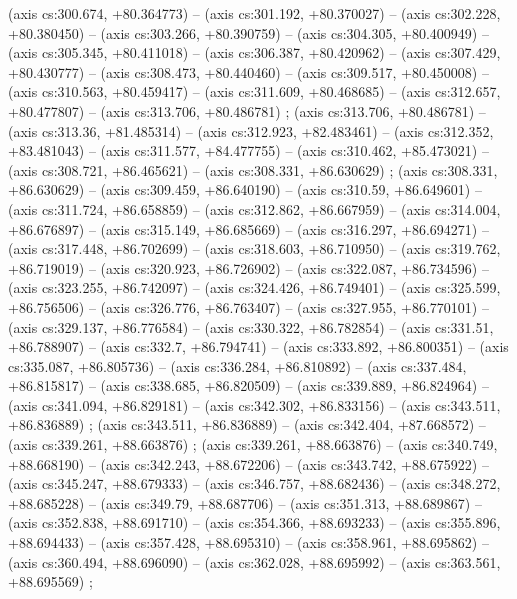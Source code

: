     (axis cs:300.674,    +80.364773) --  (axis cs:301.192,    +80.370027) --  (axis cs:302.228,    +80.380450) --  (axis cs:303.266,    +80.390759) --  (axis cs:304.305,    +80.400949) --  (axis cs:305.345,    +80.411018) --  (axis cs:306.387,    +80.420962) --  (axis cs:307.429,    +80.430777) --  (axis cs:308.473,    +80.440460) --  (axis cs:309.517,    +80.450008) --  (axis cs:310.563,    +80.459417) --  (axis cs:311.609,    +80.468685) --  (axis cs:312.657,    +80.477807) --  (axis cs:313.706,    +80.486781) ;
    (axis cs:313.706,    +80.486781) --  (axis cs:313.36,    +81.485314) --  (axis cs:312.923,    +82.483461) --  (axis cs:312.352,    +83.481043) --  (axis cs:311.577,    +84.477755) --  (axis cs:310.462,    +85.473021) --  (axis cs:308.721,    +86.465621) --  (axis cs:308.331,    +86.630629) ;
    (axis cs:308.331,    +86.630629) --  (axis cs:309.459,    +86.640190) --  (axis cs:310.59,    +86.649601) --  (axis cs:311.724,    +86.658859) --  (axis cs:312.862,    +86.667959) --  (axis cs:314.004,    +86.676897) --  (axis cs:315.149,    +86.685669) --  (axis cs:316.297,    +86.694271) --  (axis cs:317.448,    +86.702699) --  (axis cs:318.603,    +86.710950) --  (axis cs:319.762,    +86.719019) --  (axis cs:320.923,    +86.726902) --  (axis cs:322.087,    +86.734596) --  (axis cs:323.255,    +86.742097) --  (axis cs:324.426,    +86.749401) --  (axis cs:325.599,    +86.756506) --  (axis cs:326.776,    +86.763407) --  (axis cs:327.955,    +86.770101) --  (axis cs:329.137,    +86.776584) --  (axis cs:330.322,    +86.782854) --  (axis cs:331.51,    +86.788907) --  (axis cs:332.7,    +86.794741) --  (axis cs:333.892,    +86.800351) --  (axis cs:335.087,    +86.805736) --  (axis cs:336.284,    +86.810892) --  (axis cs:337.484,    +86.815817) --  (axis cs:338.685,    +86.820509) --  (axis cs:339.889,    +86.824964) --  (axis cs:341.094,    +86.829181) --  (axis cs:342.302,    +86.833156) --  (axis cs:343.511,    +86.836889) ;
    (axis cs:343.511,    +86.836889) --  (axis cs:342.404,    +87.668572) --  (axis cs:339.261,    +88.663876) ;
    (axis cs:339.261,    +88.663876) --  (axis cs:340.749,    +88.668190) --  (axis cs:342.243,    +88.672206) --  (axis cs:343.742,    +88.675922) --  (axis cs:345.247,    +88.679333) --  (axis cs:346.757,    +88.682436) --  (axis cs:348.272,    +88.685228) --  (axis cs:349.79,    +88.687706) --  (axis cs:351.313,    +88.689867) --  (axis cs:352.838,    +88.691710) --  (axis cs:354.366,    +88.693233) --  (axis cs:355.896,    +88.694433) --  (axis cs:357.428,    +88.695310) --  (axis cs:358.961,    +88.695862) --  (axis cs:360.494,    +88.696090) --  (axis cs:362.028,    +88.695992) --  (axis cs:363.561,    +88.695569) ;

